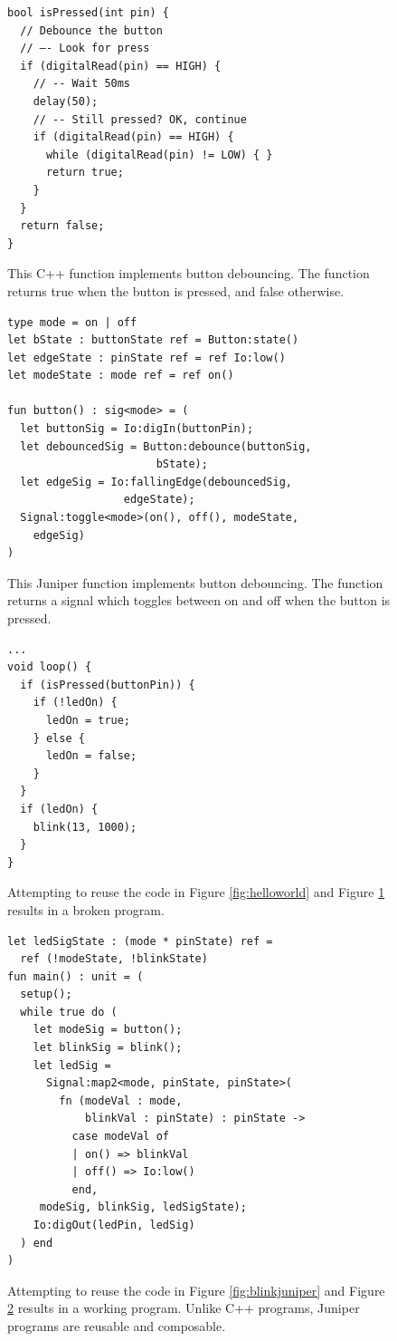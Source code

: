 \documentclass{sigplanconf}
\begin{document}
\begin{figure}
\begin{verbatim}
bool isPressed(int pin) {
  // Debounce the button
  // —- Look for press
  if (digitalRead(pin) == HIGH) {
    // -- Wait 50ms
    delay(50);
    // -- Still pressed? OK, continue 
    if (digitalRead(pin) == HIGH) {
      while (digitalRead(pin) != LOW) { }
      return true;
    }
  }
  return false;
}
\end{verbatim}
\caption{This C++ function implements button debouncing. The function returns true when the button is pressed, and false otherwise.}
\label{fig:cppispressed}
\end{figure}

\begin{figure}
\begin{verbatim}
type mode = on | off
let bState : buttonState ref = Button:state()
let edgeState : pinState ref = ref Io:low()
let modeState : mode ref = ref on()

fun button() : sig<mode> = (
  let buttonSig = Io:digIn(buttonPin);
  let debouncedSig = Button:debounce(buttonSig,
                       bState);
  let edgeSig = Io:fallingEdge(debouncedSig,
                  edgeState);
  Signal:toggle<mode>(on(), off(), modeState,
    edgeSig)
)
\end{verbatim}
\caption{This Juniper function implements button debouncing. The function returns a signal which toggles between on and off when the button is pressed.}
\label{fig:juniperbutton}
\end{figure}

\begin{figure}
\begin{verbatim}
...
void loop() {
  if (isPressed(buttonPin)) {
    if (!ledOn) {     
      ledOn = true;
    } else {
      ledOn = false;
    }
  }
  if (ledOn) {
    blink(13, 1000);
  }
}
\end{verbatim}
\caption{Attempting to reuse the code in Figure \ref{fig:helloworld} and Figure \ref{fig:cppispressed} results in a broken program.}
\end{figure}

\begin{figure}
\begin{verbatim}
let ledSigState : (mode * pinState) ref =
  ref (!modeState, !blinkState)
fun main() : unit = (
  setup();
  while true do (
    let modeSig = button();
    let blinkSig = blink();
    let ledSig =
      Signal:map2<mode, pinState, pinState>(
        fn (modeVal : mode,
            blinkVal : pinState) : pinState ->
          case modeVal of
          | on() => blinkVal
          | off() => Io:low()
          end,
     modeSig, blinkSig, ledSigState);
    Io:digOut(ledPin, ledSig)
  ) end
)
\end{verbatim}
\caption{Attempting to reuse the code in Figure \ref{fig:blinkjuniper} and Figure \ref{fig:juniperbutton} results in a working program. Unlike C++ programs, Juniper programs are reusable and composable.}
\label{fig:juniperblinkbutton}
\end{figure}
\end{document}
